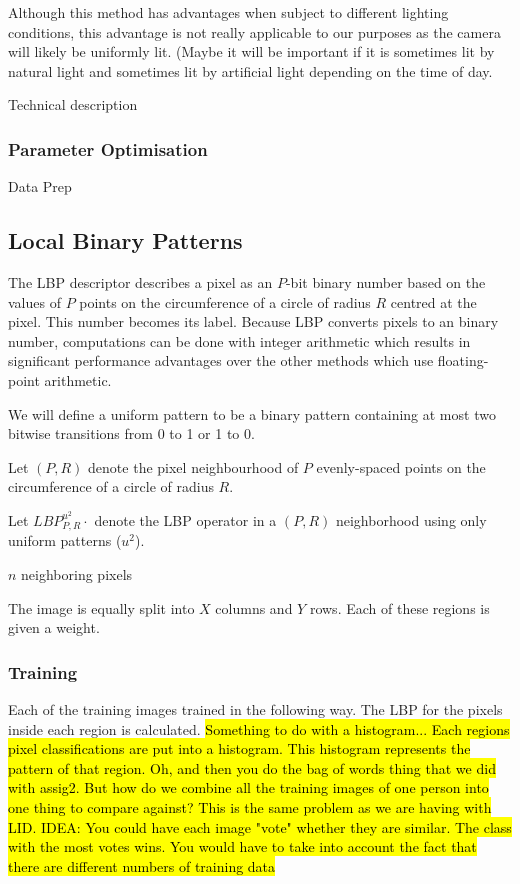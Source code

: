 \documentclass{article}
\begin{document}
Although this method has advantages when subject to different lighting conditions, this advantage is not really applicable to our purposes as the camera will likely be uniformly lit. (Maybe it will be important if it is sometimes lit by natural light and sometimes lit by artificial light depending on the time of day.


Technical description
\subsubsection{Parameter Optimisation}
Data Prep

\subsection{Local Binary Patterns}
The LBP descriptor describes a pixel as an $P$-bit binary number based on the values of $P$ points on the circumference of a circle of radius $R$ centred at the pixel. This number becomes its label.
Because LBP converts pixels to an binary number, computations can be done with integer arithmetic which results in significant performance advantages over the other methods which use floating-point arithmetic.

We will define a uniform pattern to be a binary pattern containing at most two bitwise transitions from 0 to 1 or 1 to 0. \cite{ojala2002multiresolution}

Let $(P, R)$ denote the pixel neighbourhood of $P$ evenly-spaced points on the circumference of a circle of radius $R$.

Let $LBP^{u^2}_{P,R}\cdot$ denote the LBP operator in a $(P, R)$ neighborhood using only uniform patterns ($u^2$).

$n$ neighboring pixels 

The image is equally split into $X$ columns and $Y$ rows. Each of these regions is given a weight.
\subsubsection{Training}
Each of the training images trained in the following way. The LBP for the pixels inside each region is calculated.
\hl{Something to do with a histogram...
Each regions pixel classifications are put into a histogram. This histogram represents the pattern of that region.
Oh, and then you do the bag of words thing that we did with assig2. But how do we combine all the training images of one person into one thing to compare against? This is the same problem as we are having with LID. IDEA: You could have each image "vote" whether they are similar. The class with the most votes wins. You would have to take into account the fact that there are different numbers of training data}
\end{document}

